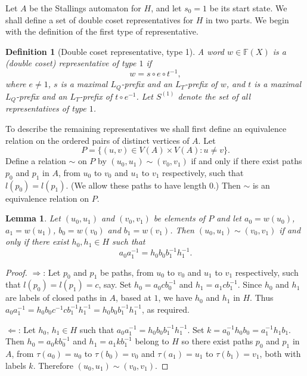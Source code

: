 \documentclass[a4paper,12pt]{article}
\renewcommand{\t}{\tau }
\newtheorem{lemma}[theorem]{Lemma}
\newtheorem{definition}[theorem]{Definition}
\numberwithin{equation}{section}
\numberwithin{figure}{section}
\newcommand{\FF}{\ensuremath{\mathbb{F}}}
\begin{document}

Let $A$ be the Stallings automaton for $H$, and let  $s_0 =
1$ be its start state.
We shall define a set of double coset representatives for $H$ in two parts.
We begin with the definition of the first type of representative.
\begin{definition}[Double coset representative, type 1]
A word $w\in \FF(X)$ is a {\em (double coset) representative of
type} $1$ if
\[w=s\circ e \circ t^{-1},\]
where $e\neq 1$, $s$ is a maximal $L_Q$-prefix and an $L_T$-prefix of $w$,
and $t$ is a maximal $L_Q$-prefix and an
$L_T$-prefix of $t\circ e^{-1}$. Let $S^{(1)}$ denote the set of all representatives of type $1$.
\end{definition}


To describe the remaining representatives we shall first define an equivalence
relation on the ordered pairs of distinct vertices of $A$. Let
\[P=\{(u,v)\in V(A)\times V(A): u\neq v\}.\]
Define a relation $\sim$ on $P$ by $(u_0,u_1)\sim (v_0,v_1)$ if and only if
there exist paths $p_0$ and $p_1$ in $A$, from $u_0$ to $v_0$ and $u_1$ to $v_1$
respectively, such that $l(p_0)=l(p_1)$. (We allow these paths to have length $0$.)
Then $\sim$ is an equivalence relation on $P$.

\begin{lemma}\label{lem:equiv_verts}
Let $(u_0,u_1)$ and $(v_0,v_1)$ be elements of $P$ and let
$a_0=w(u_0)$, $a_1=w(u_1)$, $b_0=w(v_0)$ and $b_1=w(v_1)$. Then
$(u_0,u_1)\sim (v_0,v_1)$ if and only if there exist $h_0,h_1\in H$ such that
\[a_0a_1^{-1}=h_0b_0b_1^{-1}h_1^{-1}.\]
\end{lemma}
\begin{proof}
$\Rightarrow$: Let $p_0$ and $p_1$ be paths, from $u_0$ to $v_0$ and $u_1$ to $v_1$
respectively, such that $l(p_0)=l(p_1)=c$, say. Set $h_0=a_0cb_0^{-1}$ and
$h_1=a_1cb_1^{-1}$. Since $h_0$ and $h_1$ are labels of closed paths in $A$, based at $1$, we
have $h_0$ and $h_1$ in $H$. Thus
$a_0a_1^{-1}=h_0b_0c^{-1}cb_1^{-1}h_1^{-1}=h_0b_0b_1^{-1}h_1^{-1}$, as required.

$\Leftarrow$: Let $h_0$, $h_1 \in H$ such that $a_0a_1^{-1}=h_0b_0b_1^{-1}h_1^{-1}$.
Set $k=a_0^{-1}h_0b_0=a_1^{-1}h_1b_1$. Then $h_0=a_0kb_0^{-1}$ and $h_1=a_1kb_1^{-1}$
belong to $H$ so there exist paths $p_0$ and $p_1$ in $A$,
from $\t(a_0)=u_0$ to $\t(b_0)=v_0$ and
$\t(a_1)=u_1$ to $\t(b_1)=v_1$, both with labels $k$.
Therefore $(u_0,u_1)\sim (v_0,v_1)$.
\end{proof}

\end{document}
